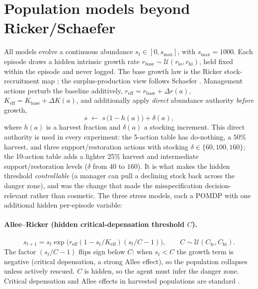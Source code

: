 \documentclass[11pt]{article}
\begin{document}
\section{Population models beyond Ricker/Schaefer}
All models evolve a continuous abundance $s_t \in [0, s_{\max}]$, with $s_{\max}=1000$.
Each episode draws a hidden intrinsic growth rate $r_{\text{base}} \sim
\mathcal{U}(r_{\text{lo}}, r_{\text{hi}})$, held fixed within the episode and never
logged. The base growth law is the Ricker stock-recruitment map \cite{ricker1954}; the
surplus-production view follows Schaefer \cite{schaefer1954}. Management actions perturb
the baseline additively, $r_{\text{eff}} = r_{\text{base}} + \Delta r(a)$,
$K_{\text{eff}} = K_{\text{base}} + \Delta K(a)$, and additionally apply \emph{direct}
abundance authority \emph{before} growth,
\begin{equation}
s \;\leftarrow\; s\,\big(1-h(a)\big) + \delta(a),
\label{eq:authority}
\end{equation}
where $h(a)$ is a harvest fraction and $\delta(a)$ a stocking increment. This direct
authority is used in every experiment: the 5-action table has do-nothing, a $50\%$
harvest, and three support/restoration actions with stocking
$\delta\in\{60,100,160\}$; the 10-action table adds a lighter $25\%$ harvest and
intermediate support/restoration levels ($\delta$ from $40$ to $160$). It is what makes
the hidden threshold \emph{controllable} (a manager can pull a declining stock back
across the danger zone), and was the change that made the misspecification
decision-relevant rather than cosmetic. The three stress models, each a POMDP with one
additional hidden per-episode variable:

\paragraph{Allee--Ricker (hidden critical-depensation threshold $C$).}
\begin{equation}
s_{t+1} = s_t \exp\!\big(r_{\text{eff}}(1 - s_t/K_{\text{eff}})(s_t/C - 1)\big),
\qquad C \sim \mathcal{U}(C_{\text{lo}}, C_{\text{hi}}).
\end{equation}
The factor $(s_t/C - 1)$ flips sign below $C$: when $s_t < C$ the growth term is negative
(critical depensation, a strong Allee effect), so the population collapses unless
actively rescued. $C$ is hidden, so the agent must infer the danger zone. Critical
depensation and Allee effects in harvested populations are standard
\cite{clark1990,courchamp2008}.
\end{document}
